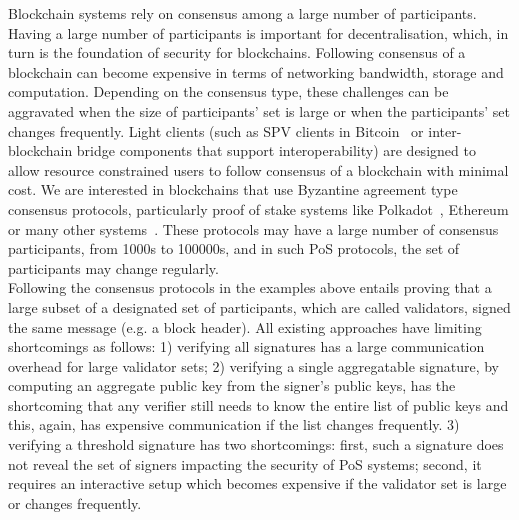 Blockchain systems rely on consensus among a large number of participants. Having a large number of participants is important for 
decentralisation, which, in turn is the foundation of security for blockchains. Following consensus of a blockchain can become expensive in 
terms of networking bandwidth, storage and computation. Depending on the consensus type, these challenges can be aggravated when the 
size of participants' set is large or when the participants' set changes frequently. Light clients (such as SPV clients in Bitcoin~\cite{bitcoin} or inter-blockchain 
bridge components that support interoperability) are designed to allow resource constrained users to follow consensus of a blockchain with 
minimal cost. We are interested in blockchains that use Byzantine agreement type consensus protocols, particularly proof of stake systems 
like Polkadot~\cite{polkadot}, Ethereum 
or many other systems~\cite{dfinity,mina,celo,tendermint_paper,cosmos}. These protocols 
may have a large number of consensus participants, from 1000s to 100000s, and in such PoS protocols, the set of participants may change regularly. \\

\noindent Following the consensus protocols in the examples above entails proving that a large subset of a designated set of participants, 
which are called validators, signed the same message (e.g. a block header). All existing approaches have limiting shortcomings as follows:
1) verifying all signatures has a large communication overhead for large validator sets;
2) verifying a single aggregatable signature, by computing an aggregate public key from the signer's public keys, has the shortcoming that any verifier still 
needs to know the entire list of public keys and this, again, has expensive communication if the list changes frequently. 
3) verifying a threshold signature has two shortcomings: first, such a signature does not reveal the set of signers impacting the 
security of PoS systems; second, it requires an interactive setup which becomes expensive if the validator set is large or changes frequently.

